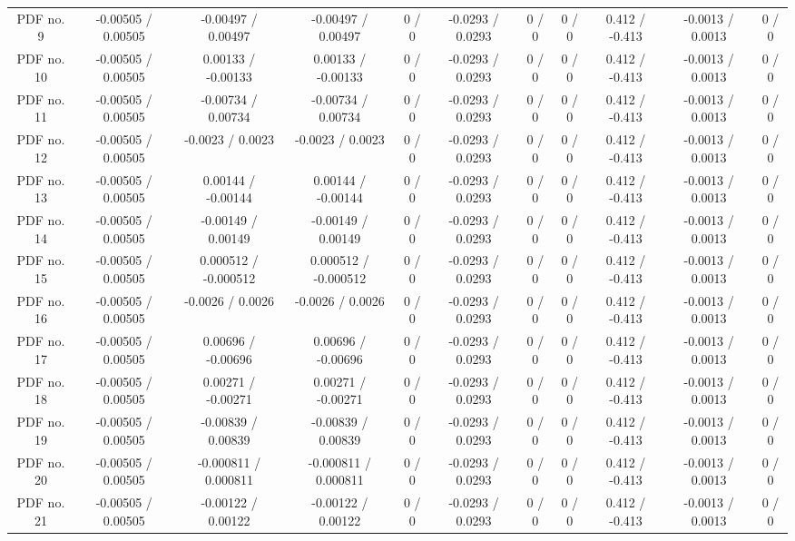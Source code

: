 \begin{table}[htbp]
\begin{center}
\begin{tabular}{|c|c|c|c|c|c|c|c|c|c|c|}
  PDF no. 9 & -0.00505 / 0.00505 & -0.00497 / 0.00497 & -0.00497 / 0.00497 & 0 / 0 & -0.0293 / 0.0293 & 0 / 0 & 0 / 0 & 0.412 / -0.413 & -0.0013 / 0.0013 & 0 / 0 \\ 
  PDF no. 10 & -0.00505 / 0.00505 & 0.00133 / -0.00133 & 0.00133 / -0.00133 & 0 / 0 & -0.0293 / 0.0293 & 0 / 0 & 0 / 0 & 0.412 / -0.413 & -0.0013 / 0.0013 & 0 / 0 \\ 
  PDF no. 11 & -0.00505 / 0.00505 & -0.00734 / 0.00734 & -0.00734 / 0.00734 & 0 / 0 & -0.0293 / 0.0293 & 0 / 0 & 0 / 0 & 0.412 / -0.413 & -0.0013 / 0.0013 & 0 / 0 \\ 
  PDF no. 12 & -0.00505 / 0.00505 & -0.0023 / 0.0023 & -0.0023 / 0.0023 & 0 / 0 & -0.0293 / 0.0293 & 0 / 0 & 0 / 0 & 0.412 / -0.413 & -0.0013 / 0.0013 & 0 / 0 \\ 
  PDF no. 13 & -0.00505 / 0.00505 & 0.00144 / -0.00144 & 0.00144 / -0.00144 & 0 / 0 & -0.0293 / 0.0293 & 0 / 0 & 0 / 0 & 0.412 / -0.413 & -0.0013 / 0.0013 & 0 / 0 \\ 
  PDF no. 14 & -0.00505 / 0.00505 & -0.00149 / 0.00149 & -0.00149 / 0.00149 & 0 / 0 & -0.0293 / 0.0293 & 0 / 0 & 0 / 0 & 0.412 / -0.413 & -0.0013 / 0.0013 & 0 / 0 \\ 
  PDF no. 15 & -0.00505 / 0.00505 & 0.000512 / -0.000512 & 0.000512 / -0.000512 & 0 / 0 & -0.0293 / 0.0293 & 0 / 0 & 0 / 0 & 0.412 / -0.413 & -0.0013 / 0.0013 & 0 / 0 \\ 
  PDF no. 16 & -0.00505 / 0.00505 & -0.0026 / 0.0026 & -0.0026 / 0.0026 & 0 / 0 & -0.0293 / 0.0293 & 0 / 0 & 0 / 0 & 0.412 / -0.413 & -0.0013 / 0.0013 & 0 / 0 \\ 
  PDF no. 17 & -0.00505 / 0.00505 & 0.00696 / -0.00696 & 0.00696 / -0.00696 & 0 / 0 & -0.0293 / 0.0293 & 0 / 0 & 0 / 0 & 0.412 / -0.413 & -0.0013 / 0.0013 & 0 / 0 \\ 
  PDF no. 18 & -0.00505 / 0.00505 & 0.00271 / -0.00271 & 0.00271 / -0.00271 & 0 / 0 & -0.0293 / 0.0293 & 0 / 0 & 0 / 0 & 0.412 / -0.413 & -0.0013 / 0.0013 & 0 / 0 \\ 
  PDF no. 19 & -0.00505 / 0.00505 & -0.00839 / 0.00839 & -0.00839 / 0.00839 & 0 / 0 & -0.0293 / 0.0293 & 0 / 0 & 0 / 0 & 0.412 / -0.413 & -0.0013 / 0.0013 & 0 / 0 \\ 
  PDF no. 20 & -0.00505 / 0.00505 & -0.000811 / 0.000811 & -0.000811 / 0.000811 & 0 / 0 & -0.0293 / 0.0293 & 0 / 0 & 0 / 0 & 0.412 / -0.413 & -0.0013 / 0.0013 & 0 / 0 \\ 
  PDF no. 21 & -0.00505 / 0.00505 & -0.00122 / 0.00122 & -0.00122 / 0.00122 & 0 / 0 & -0.0293 / 0.0293 & 0 / 0 & 0 / 0 & 0.412 / -0.413 & -0.0013 / 0.0013 & 0 / 0 \\ 

\end{tabular}
\end{center}
\end{table}
